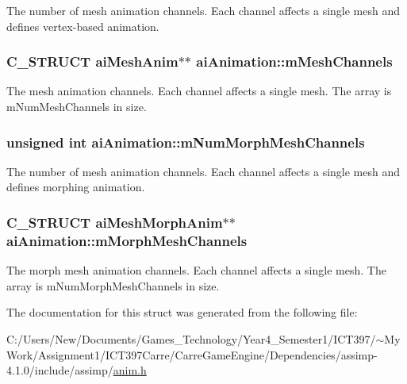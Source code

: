 The number of mesh animation channels. Each channel affects a single mesh and defines vertex-based animation. \hypertarget{structai_animation_f05138121dbde8b31aa031505b454c85}{
\subsubsection[mMeshChannels]{\setlength{\rightskip}{0pt plus 5cm}C\_\-STRUCT {\bf aiMeshAnim}$\ast$$\ast$ {\bf aiAnimation::mMeshChannels}}}
\label{structai_animation_f05138121dbde8b31aa031505b454c85}


The mesh animation channels. Each channel affects a single mesh. The array is mNumMeshChannels in size. \hypertarget{structai_animation_ed9aa50bdf38c9f6064f79f5aab38d59}{
\subsubsection[mNumMorphMeshChannels]{\setlength{\rightskip}{0pt plus 5cm}unsigned int {\bf aiAnimation::mNumMorphMeshChannels}}}
\label{structai_animation_ed9aa50bdf38c9f6064f79f5aab38d59}


The number of mesh animation channels. Each channel affects a single mesh and defines morphing animation. \hypertarget{structai_animation_bcc055a00bed8ce3329fdf4a9c22ec9c}{
\subsubsection[mMorphMeshChannels]{\setlength{\rightskip}{0pt plus 5cm}C\_\-STRUCT {\bf aiMeshMorphAnim}$\ast$$\ast$ {\bf aiAnimation::mMorphMeshChannels}}}
\label{structai_animation_bcc055a00bed8ce3329fdf4a9c22ec9c}


The morph mesh animation channels. Each channel affects a single mesh. The array is mNumMorphMeshChannels in size. 

The documentation for this struct was generated from the following file:\begin{CompactItemize}
\item 
C:/Users/New/Documents/Games\_\-Technology/Year4\_\-Semester1/ICT397/$\sim$My Work/Assignment1/ICT397Carre/CarreGameEngine/Dependencies/assimp-4.1.0/include/assimp/\hyperlink{anim_8h}{anim.h}\end{CompactItemize}
